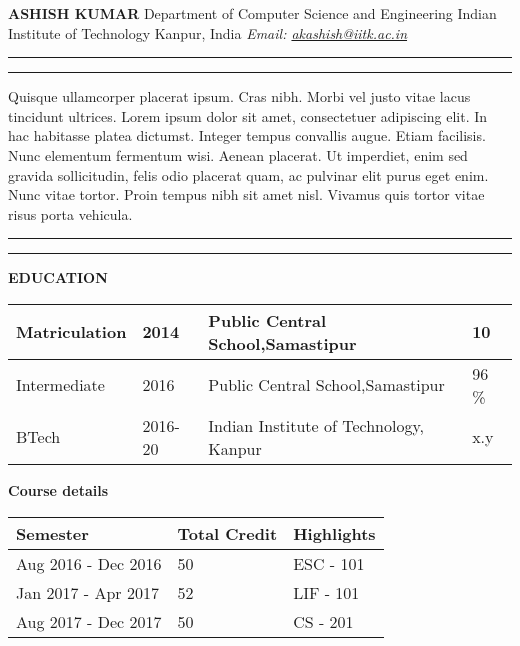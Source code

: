 \documentclass{article}
\newcommand\fs[1][1cm]{\hspace*{#1}}
\begin{document}
\noindent\fs[0.2 cm]\textbf{ASHISH KUMAR}\newline
\fs[0.2 cm]Department of Computer Science and Engineering \newline
\fs[0.2 cm]Indian Institute of Technology Kanpur, India \newline
\fs[0.2 cm]\textit{Email: \href{mailto:akashish@iitk.ac.in}{akashish@iitk.ac.in}}\newline
\hrule
\vspace{0.1cm}
\hrule
\vspace{0.2cm}
\noindent Quisque ullamcorper placerat ipsum. Cras nibh. Morbi vel justo vitae lacus tincidunt ultrices. Lorem ipsum
dolor sit amet, consectetuer adipiscing elit. In hac habitasse platea dictumst. Integer tempus convallis augue.
Etiam facilisis. Nunc elementum fermentum wisi. Aenean placerat. Ut imperdiet, enim sed gravida sollicitudin,
felis odio placerat quam, ac pulvinar elit purus eget enim. Nunc vitae tortor. Proin tempus nibh sit amet nisl.
Vivamus quis tortor vitae risus porta vehicula.
\vspace{0.2cm}
\hrule
\vspace{0.1cm}
\hrule
\vspace{0.3cm}



\noindent\fs[0.2cm]\textbf{EDUCATION}\newline
\vspace{0cm}
\newline
\begin{tabular}{ | l | l| l | l| }
\hline
Matriculation & 2014 & Public Central School,Samastipur & 10 \\
\hline
Intermediate & 2016 & Public Central School,Samastipur & 96 \% \\
\hline
BTech & 2016-20 & Indian Institute of Technology, Kanpur & x.y \\
\hline
\end{tabular}

\vspace{0.4cm}
\noindent\fs[0.2cm]\textbf{Course details}\newline
\vspace{0cm}
\newline
\begin{tabular}{ | l | l| l | }
\hline
\textbf{Semester} & \textbf{Total Credit}  & \textbf{Highlights} \\
\hline
Aug 2016 - Dec 2016 & 50 & ESC - 101 \\
\hline
Jan 2017 - Apr 2017 & 52 & LIF - 101  \\
\hline
Aug 2017 - Dec 2017 & 50 & CS - 201 \\
\hline
\end{tabular}
\end{document}
